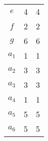 \begin{center}
\begin{minipage}[t]{.4\linewidth}
\begin{longtable}[c]{| c | c | c|}
     $e$ & 4 & 4\\
     $f$ & 2 & 2\\
     $g$ & 6 & 6\\
     $a_1$ & 1 & 1\\
     $a_2$ & 3 & 3\\
     $a_3$ & 3 & 3\\
     $a_4$ & 1 & 1\\
     $a_5$ & 5 & 5\\
     $a_6$ & 5 & 5\\
     \hline
\end{longtable}
\end{minipage}
\end{center}

